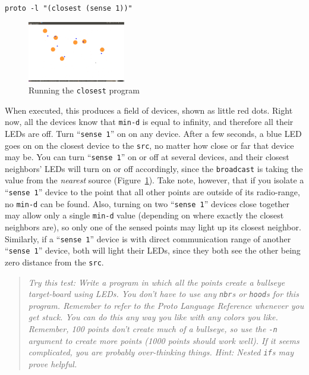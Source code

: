 \documentclass{article}
\newcommand\code[1]{\begin{center}\var{#1}\end{center}}
\newcommand\problem[1]{\begin{quote}{\em #1}\end{quote}}
\newcommand\var[1]{{\tt #1}}
\newcommand\qvar[1]{``{\tt #1}''}
\begin{document}
\code{proto -l "(closest (sense 1))"}

\begin{figure}
  \includegraphics[width=0.38\textwidth]{figures/closest.png}
  \caption{Running the \var{closest} program}
  \vspace{-0.5cm}
  \label{f:closest}
\end{figure}

When executed, this produces a field of devices, shown as little red
dots.  Right now, all the devices know that \var{min-d} is equal to
infinity, and therefore all their LEDs are off.  Turn \qvar{sense 1}
on on any device.  After a few seconds, a blue LED goes on on the
closest device to the \var{src}, no matter how close or far that
device may be.  You can turn \qvar{sense 1} on or off at several
devices, and their closest neighbors' LEDs will turn on or off
accordingly, since the \var{broadcast} is taking the value from the
{\em nearest} source (Figure~\ref{f:closest}).  Take note, however,
that if you isolate a \qvar{sense 1} device to the point that all
other points are outside of its radio-range, no \var{min-d} can be
found.  Also, turning on two \qvar{sense 1} devices close together may
allow only a single \var{min-d} value (depending on where exactly the
closest neighbors are), so only one of the sensed points may light up
its closest neighbor.  Similarly, if a \qvar{sense 1} device is with
direct communication range of another \qvar{sense 1} device, both will
light their LEDs, since they both see the other being zero distance
from the \var{src}.

\problem{Try this test: Write a program in which all the points create
  a bullseye target-board using LEDs.  You don't have to use any
  \var{nbr}s or \var{hood}s for this program.  Remember to refer to
  the Proto Language Reference whenever you get stuck.  You can do
  this any way you like with any colors you like.  Remember, 100
  points don't create much of a bullseye, so use the \var{-n} argument
  to create more points (1000 points should work well).  If it seems
  complicated, you are probably over-thinking things.  Hint: Nested
  \var{if}s may prove helpful.}
\end{document}
